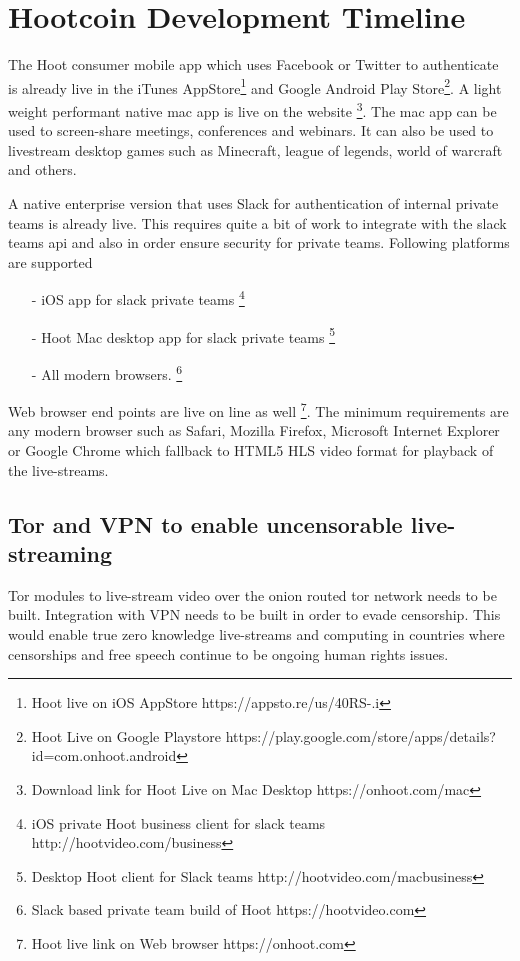\documentclass{article}
\begin{document}

\section{Hootcoin Development Timeline}
The Hoot consumer mobile app which uses Facebook or Twitter to authenticate is already live in the iTunes AppStore\footnote{Hoot live on iOS AppStore https://appsto.re/us/40RS-.i} and Google Android Play Store\footnote{Hoot Live on Google Playstore https://play.google.com/store/apps/details?id=com.onhoot.android}.
A light weight performant native mac app is live on
the website \footnote{Download link for Hoot Live on Mac Desktop https://onhoot.com/mac}. The mac app can be used to screen-share meetings, conferences and webinars. It can also be used to livestream desktop games such as Minecraft, league of legends, world of warcraft and others.

A native enterprise version that uses Slack for authentication of internal private teams is already live.
 This requires quite a bit of work to integrate with the slack teams api and also in order ensure security for private teams. Following platforms are supported
\begin{itemize}

\item[-]iOS app for slack private teams \footnote{ iOS private Hoot business client for slack teams http://hootvideo.com/business}
\item[-]Hoot Mac desktop app for slack private teams \footnote{Desktop Hoot client for Slack teams http://hootvideo.com/macbusiness}
\item[-]All modern browsers. \footnote{Slack based private team build of Hoot https://hootvideo.com}
\end{itemize}

Web browser end points are live on line as well
\footnote{Hoot live link on Web browser https://onhoot.com}. The minimum requirements are any modern
browser such as Safari, Mozilla Firefox, Microsoft Internet Explorer or Google Chrome which fallback to HTML5 HLS video format for playback
of the live-streams.


\subsection{Tor and VPN to enable uncensorable live-streaming }
Tor modules to live-stream video over the onion routed tor network needs to be built. Integration with VPN needs to be built in order to evade censorship. This would enable true zero knowledge live-streams and computing in countries where censorships and free speech continue to be ongoing human rights issues.
\end{document}

